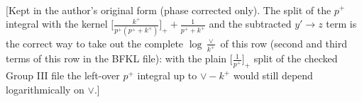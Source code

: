 \documentclass[9pt]{article}
\numberwithin{equation}{section}
\begin{document}
\begin{align}
\end{align} {\color{red}[Kept in the author's original form (phase corrected only). The split of the $p^{+}$ integral with the kernel $\big[\frac{k^{+}}{p^{+}(p^{+}+k^{+})}\big]_{+}+\frac{1}{p^{+}+k^{+}}$ and the subtracted $y'\to z$ term is the correct way to take out the complete $\log\frac{\vee}{k^{+}}$ of this row (second and third terms of this row in the BFKL file): with the plain $\big[\frac{1}{p^{+}}\big]_{+}$ split of the checked Group III file the left-over $p^{+}$ integral up to $\vee-k^{+}$ would still depend logarithmically on $\vee$.]}\par\noindent
\end{document}
